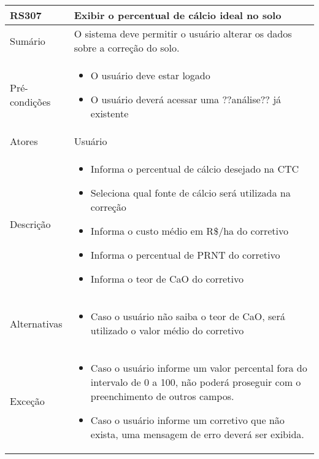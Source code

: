\begin{quadro}[H]
    \begin{tabular}{|p{3cm}|p{11cm}|}
        \hline
        \textbf{RS307} & \textbf{Exibir o percentual de cálcio ideal no solo}                         \\
        \hline
        Sumário        & O sistema deve permitir o usuário alterar os dados sobre a correção do solo. \\
        \hline
        Pré-condições  & \begin{itemize}
            \item O usuário deve estar logado
            \item O usuário deverá acessar uma ??análise?? já existente
        \end{itemize}                                                   \\
        \hline
        Atores         & Usuário                                                                      \\
        \hline
        Descrição      &
        \begin{itemize}
            \item Informa o percentual de cálcio desejado na CTC
            \item Seleciona qual fonte de cálcio será utilizada na correção
            \item Informa o custo médio em R\$/ha do corretivo
            \item Informa o percentual de PRNT do corretivo
            \item Informa o teor de CaO do corretivo
        \end{itemize}                                                                    \\
        \hline
        Alternativas   &
        \begin{itemize}
            \item Caso o usuário não saiba o teor de CaO, será utilizado o valor médio do corretivo
        \end{itemize}                                                                    \\
        \hline
        Exceção        &
        \begin{itemize}
            \item Caso o usuário informe um valor percental fora do intervalo de 0 a 100, não poderá proseguir com o preenchimento de outros campos.
            \item Caso o usuário informe um corretivo que não exista, uma mensagem de erro deverá ser exibida.
        \end{itemize}                                                                    \\
        \hline
    \end{tabular}
\end{quadro}

